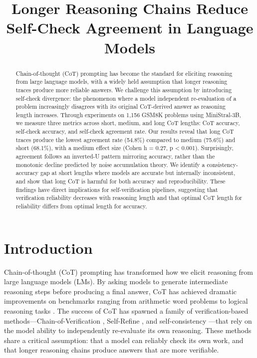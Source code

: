 \documentclass[11pt,letterpaper]{article}
\title{Longer Reasoning Chains Reduce Self-Check Agreement in Language Models}
\author{}
\date{}
\begin{document}
\maketitle

\begin{abstract}
Chain-of-thought (CoT) prompting has become the standard for eliciting reasoning from large language models, with a widely held assumption that longer reasoning traces produce more reliable answers. We challenge this assumption by introducing self-check divergence: the phenomenon where a model independent re-evaluation of a problem increasingly disagrees with its original CoT-derived answer as reasoning length increases. Through experiments on 1,156 GSM8K problems using MiniStral-3B, we measure three metrics across short, medium, and long CoT lengths: CoT accuracy, self-check accuracy, and self-check agreement rate. Our results reveal that long CoT traces produce the lowest agreement rate (54.8\%) compared to medium (75.6\%) and short (68.1\%), with a medium effect size (Cohen h = 0.27, p < 0.001). Surprisingly, agreement follows an inverted-U pattern mirroring accuracy, rather than the monotonic decline predicted by noise accumulation theory. We identify a consistency-accuracy gap at short lengths where models are accurate but internally inconsistent, and show that long CoT is harmful for both accuracy and reproducibility. These findings have direct implications for self-verification pipelines, suggesting that verification reliability decreases with reasoning length and that optimal CoT length for reliability differs from optimal length for accuracy.
\end{abstract}

\section{Introduction}

Chain-of-thought (CoT) prompting has transformed how we elicit reasoning from large language models (LMs). By asking models to generate intermediate reasoning steps before producing a final answer, CoT has achieved dramatic improvements on benchmarks ranging from arithmetic word problems to logical reasoning tasks \citep{Wei2022}. The success of CoT has spawned a family of verification-based methods---Chain-of-Verification \citep{Dhuliawala2023}, Self-Refine \citep{Madaan2023}, and self-consistency \citep{Wang2022}---that rely on the model ability to independently re-evaluate its own reasoning. These methods share a critical assumption: that a model can reliably check its own work, and that longer reasoning chains produce answers that are more verifiable.
\end{document}
